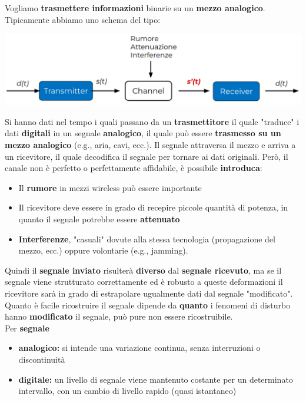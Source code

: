 Vogliamo \textbf{trasmettere informazioni} binarie su un \textbf{mezzo analogico}. Tipicamente abbiamo uno schema del tipo: 
\begin{center}
	\includegraphics[width=0.95\linewidth]{img/PTT/tr-scheme}
\end{center}
Si hanno dati nel tempo i quali passano da un \textbf{trasmettitore} il quale "traduce" i dati \textbf{digitali} in un segnale \textbf{analogico}, il quale può essere \textbf{trasmesso su un mezzo analogico} (e.g., aria, cavi, ecc.). Il segnale attraversa il mezzo e arriva a un ricevitore, il quale decodifica il segnale per tornare ai dati originali. Però, il canale non è perfetto o perfettamente affidabile, è possibile \textbf{introduca}:
\begin{itemize}
	\item Il \textbf{rumore} in mezzi wireless può essere importante
	\item Il ricevitore deve essere in grado di recepire piccole quantità di potenza, in quanto il segnale potrebbe essere \textbf{attenuato}
	\item \textbf{Interferenze}, "casuali" dovute alla stessa tecnologia (propagazione del mezzo, ecc.) oppure volontarie (e.g., jamming).
\end{itemize}
Quindi il \textbf{segnale inviato} risulterà \textbf{diverso} dal \textbf{segnale ricevuto}, ma se il segnale viene strutturato correttamente ed è robusto a queste deformazioni il ricevitore sarà in grado di estrapolare ugualmente dati dal segnale "modificato". Quanto è facile ricostruire il segnale dipende da \textbf{quanto} i fenomeni di disturbo hanno \textbf{modificato} il segnale, può pure non essere ricostruibile. \\

Per \textbf{segnale}
\begin{itemize}
	\item \textbf{analogico:} si intende una variazione continua, senza interruzioni o discontinuità
	\item \textbf{digitale:} un livello di segnale viene mantenuto costante per un determinato intervallo, con un cambio di livello rapido (quasi istantaneo)
\end{itemize}

